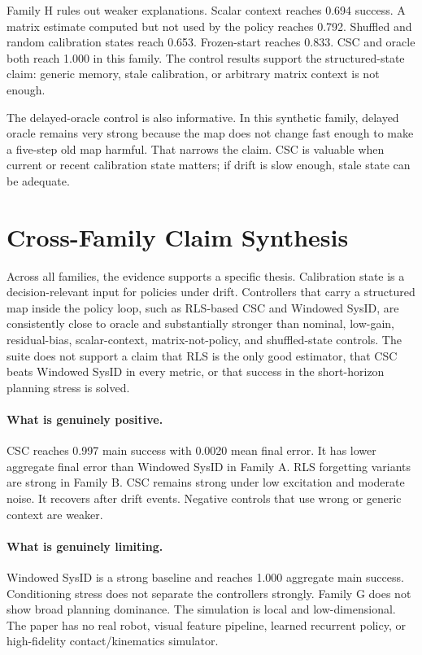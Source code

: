 \documentclass{article}
\begin{document}
Family H rules out weaker explanations. Scalar context reaches 0.694 success.
A matrix estimate computed but not used by the policy reaches 0.792. Shuffled
and random calibration states reach 0.653. Frozen-start reaches 0.833. CSC and
oracle both reach 1.000 in this family. The control results support the
structured-state claim: generic memory, stale calibration, or arbitrary matrix
context is not enough.

The delayed-oracle control is also informative. In this synthetic family,
delayed oracle remains very strong because the map does not change fast enough
to make a five-step old map harmful. That narrows the claim. CSC is valuable
when current or recent calibration state matters; if drift is slow enough,
stale state can be adequate.

\section{Cross-Family Claim Synthesis}



Across all families, the evidence supports a specific thesis. Calibration
state is a decision-relevant input for policies under drift. Controllers that
carry a structured map inside the policy loop, such as RLS-based CSC and
Windowed SysID, are consistently close to oracle and substantially stronger
than nominal, low-gain, residual-bias, scalar-context, matrix-not-policy, and
shuffled-state controls. The suite does not support a claim that RLS is the
only good estimator, that CSC beats Windowed SysID in every metric, or that
success in the short-horizon planning stress is solved.

\paragraph{What is genuinely positive.}
CSC reaches 0.997 main success with 0.0020 mean final error. It has lower
aggregate final error than Windowed SysID in Family A. RLS forgetting variants
are strong in Family B. CSC remains strong under low excitation and moderate
noise. It recovers after drift events. Negative controls that use wrong or
generic context are weaker.

\paragraph{What is genuinely limiting.}
Windowed SysID is a strong baseline and reaches 1.000 aggregate main success.
Conditioning stress does not separate the controllers strongly. Family G does
not show broad planning dominance. The simulation is local and low-dimensional.
The paper has no real robot, visual feature pipeline, learned recurrent policy,
or high-fidelity contact/kinematics simulator.
\end{document}
